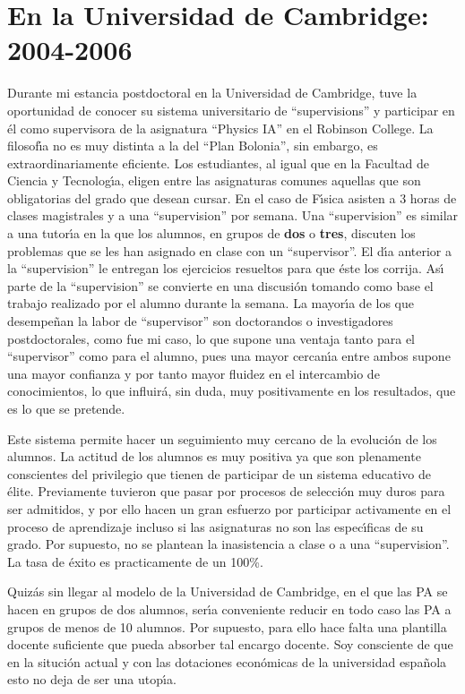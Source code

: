 \section{En la Universidad de Cambridge: 2004-2006}

Durante mi estancia postdoctoral en la Universidad de Cambridge, tuve la 
oportunidad de conocer su sistema universitario de 
``supervisions'' y participar en \'{e}l como supervisora de 
la asignatura ``Physics IA'' en el Robinson College.
 La filosof\'{\i}a no es muy distinta
a la del ``Plan Bolonia'', sin embargo, es extraordinariamente eficiente.
Los estudiantes, al igual que  en la 
Facultad de Ciencia y Tecnolog\'{\i}a, eligen
  entre las asignaturas comunes aquellas que son obligatorias
del grado que desean cursar. En el caso de F\'{\i}sica asisten
a 3 horas de clases magistrales  y a una ``supervision'' por semana.
Una ``supervision'' es similar a una tutor\'{\i}a en la que los alumnos, 
en grupos de {\bf dos} o {\bf tres},
 discuten los problemas que se les han asignado 
en clase con un ``supervisor''. El d\'{\i}a anterior a la ``supervision''
le entregan los ejercicios resueltos para que \'{e}ste los corrija.
As\'{\i} parte de la ``supervision'' se convierte en una discusi\'{o}n
tomando como base el trabajo realizado por el alumno durante la semana.
La mayor\'{\i}a de los que desempe\~{n}an  la labor de  ``supervisor'' son
doctorandos o investigadores postdoctorales, como fue
mi caso, lo que supone una ventaja tanto para el ``supervisor'' como
para el alumno, pues una mayor cercan\'{\i}a entre ambos supone una
mayor confianza y por tanto mayor fluidez en el intercambio de 
conocimientos, lo  que influir\'{a}, sin duda, muy positivamente en los resultados,
que es lo que se pretende.

Este sistema permite hacer un seguimiento 
muy cercano de la evoluci\'{o}n de los alumnos.
La actitud de los alumnos es muy positiva ya que
  son plenamente conscientes del privilegio que
tienen de participar de  un sistema educativo de \'{e}lite.
Previamente tuvieron que pasar por procesos de selecci\'{o}n 
muy duros para ser admitidos, y por ello  hacen
un gran esfuerzo por participar activamente en el proceso de aprendizaje
incluso si las asignaturas no son las espec\'{\i}ficas de su grado. Por 
supuesto, no se plantean la inasistencia a clase o a una ``supervision''.
La tasa de \'{e}xito es practicamente de un 100\%.


 Quiz\'{a}s
sin llegar al modelo de la Universidad de Cambridge,
en el que las PA se hacen en grupos de dos alumnos,
ser\'{\i}a conveniente reducir en todo caso las PA a
grupos de menos de 10 alumnos. Por supuesto, para ello hace falta una
plantilla docente suficiente que pueda absorber tal encargo docente.
Soy consciente de que en la situci\'{o}n actual y con 
las dotaciones econ\'{o}micas de la universidad espa\~{n}ola
 esto no deja de ser una 
utop\'{\i}a.

